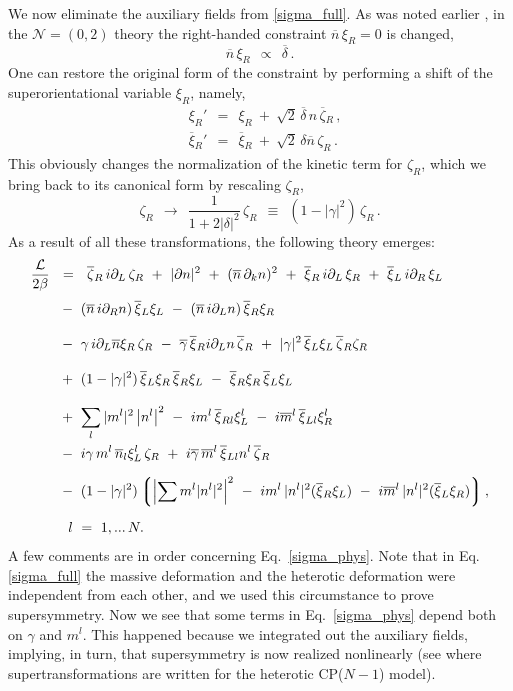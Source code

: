\documentclass[12pt]{article}
\newcommand{\ntwoo}{${\mathcal N}= \left(0,2\right) $ }
\newcommand{\p}{\partial}
\newcommand{\ov}{\overline}
\newcommand{\mc}[1]{\mathcal{#1}}
\newcommand{\lgr}{\left\lgroup}
\newcommand{\rgr}{\right\rgroup}
\newcommand{\bxir}{\ov{\xi}{}_R}
\newcommand{\bxil}{\ov{\xi}{}_L}
\newcommand{\xir}{\xi_R}
\newcommand{\xil}{\xi_L}
\newcommand{\bzr}{\ov{\zeta}{}_R}
\newcommand{\zr}{\zeta_R}
\newcommand{\nbar}{\ov{n}}
\begin{document}
        We now eliminate the auxiliary fields from \eqref{sigma_full}. 
        As was noted earlier \cite{Edalati}, in the \ntwoo theory the right-handed constraint $ \nbar\,\xir = 0 $ is
changed,
\[
	\nbar\, \xir ~~\propto~~ \ov{\delta}\,.
\]
One can restore the original form of 
the constraint  by performing a shift of the superorientational variable $ \xir $, namely,
\begin{align*}
%
	& \xi_R' ~~=~~ \xir ~+~ \sqrt{2}\, \ov{\delta}\, n\, \bzr \,, \\[1mm]
%
	& \ov{\xi}{}_R' ~~=~~ \bxir ~+~ \sqrt{2}\, \delta \nbar\, \zr\,.
\end{align*}
	This obviously changes the normalization of the kinetic term for $ \zr $, which we
	bring back to its canonical form by rescaling $ \zr $,
\[
	\zr ~~\to~~ \frac{1}{1 + 2|\delta|^2}\,\zr ~~\equiv~~ ( 1 - |\gamma|^2 )\, \zr\,.
\]
As a result of all these transformations,  the following theory emerges:
\begin{align}
%
\notag
	\frac{\mc{L}}{2\beta} & ~~=~~ \bzr\, i\p_L\, \zr ~+~ 
		| \p n |^2  ~+~ (\nbar\, \p_k n)^2 ~+~ \bxir\, i\p_L\, \xir ~+~ \bxil\, i\p_R\, \xil
	\\[1mm]
%
\notag
	&~ 
	~-~ (\nbar\, i\p_R n)\, \bxil \xil ~-~  (\nbar\, i\p_L n)\, \bxir \xir
	\\[3mm]
%
\notag
	&~
	~-~ \gamma\, i\p_L\nbar \xir\, \zr ~-~ \ov{\gamma}\, \bxir i\p_L n\, \bzr
	~+~ |\gamma|^2\, \bxil \xil\, \bzr \zr
	\\[3mm]
%
\label{sigma_phys}
	&~
	~+~ (1-|\gamma|^2)\,\bxil\xir\,\bxir\xil ~-~ \bxir\xir\,\bxil\xil
	\\[3mm]
%	
\notag
	&~
	~+~ \sum_l |m^l|^2 \left|n^l \right|^2 
	~-~ i m^l\, \ov{\xi}{}_{Rl} \xi_L^l ~-~ i\ov{m}{}^l\, \ov{\xi}{}_{Ll} \xi_R^l
	\\
%
\notag
	&~
	~-~ i\gamma\, m^l\, \ov{n}{}_l \xi_L^l\, \zr 
	~+~ i\ov{\gamma}\, \ov{m}{}^l\, \ov{\xi}{}_{Ll} n^l\, \bzr
	\\[2mm]
%
\notag
	&~
	~-~ (1-|\gamma|^2)
	\lgr \left|\sum m^l |n^l|^2 \right|^2 
		~-~ i m^l\, |n^l|^2 (\bxir\xil) ~-~ i\ov{m}{}^l\, |n^l|^2(\bxil\xir)
	\rgr ,
	\\[2mm]
%
\notag
	&
	~~~~  l ~=~ 1,...\,N.
\end{align}	
	A few comments are in order concerning Eq.~\eqref{sigma_phys}. 
	Note that in Eq. \eqref{sigma_full} the massive deformation and the heterotic deformation
	were independent from each other, and we used this
	circumstance to prove supersymmetry.
	Now we see that some terms in Eq.~\eqref{sigma_phys}  depend both on $\gamma$ and
	$m^l$.
	This happened because we  integrated out the auxiliary fields, implying, in turn,  
 that supersymmetry is now realized nonlinearly 
	(see \cite{BSYhet} where supertransformations are written for the
	heterotic CP($N-1$) model).
\end{document}
